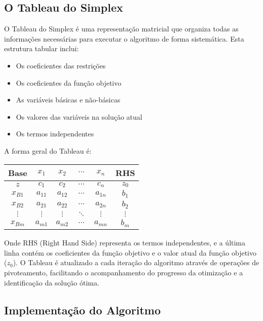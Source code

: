\documentclass{article}
\begin{document}
\subsection{O Tableau do Simplex}

O Tableau do Simplex é uma representação matricial que organiza todas as informações necessárias para executar o algoritmo de forma sistemática. Esta estrutura tabular inclui:

\begin{itemize}
    \item Os coeficientes das restrições
    \item Os coeficientes da função objetivo
    \item As variáveis básicas e não-básicas
    \item Os valores das variáveis na solução atual
    \item Os termos independentes
\end{itemize}

A forma geral do Tableau é:

\begin{table}[h]
\centering
\begin{tabular}{c|cccc|c}
Base & $x_1$ & $x_2$ & $\cdots$ & $x_n$ & RHS \\
\hline
$z$ & $c_1$ & $c_2$ & $\cdots$ & $c_n$ & $z_0$ \\
\hline
$x_{B1}$ & $a_{11}$ & $a_{12}$ & $\cdots$ & $a_{1n}$ & $b_1$ \\
$x_{B2}$ & $a_{21}$ & $a_{22}$ & $\cdots$ & $a_{2n}$ & $b_2$ \\
$\vdots$ & $\vdots$ & $\vdots$ & $\ddots$ & $\vdots$ & $\vdots$ \\
$x_{Bm}$ & $a_{m1}$ & $a_{m2}$ & $\cdots$ & $a_{mn}$ & $b_m$ \\
\end{tabular}
\end{table}

Onde RHS (Right Hand Side) representa os termos independentes, e a última linha contém os coeficientes da função objetivo e o valor atual da função objetivo ($z_0$). O Tableau é atualizado a cada iteração do algoritmo através de operações de pivoteamento, facilitando o acompanhamento do progresso da otimização e a identificação da solução ótima.


\subsection{Implementação do Algoritmo}
\end{document}
